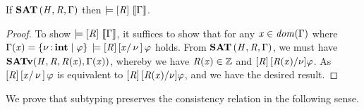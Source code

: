 \begin{lemma}
  \label{lem:sat-implies-gamma}
  If $\mathbf{SAT} \, (  \mathit{H}  ,  \mathit{R}  ,  \Gamma  )$ then $\models  [  \mathit{R}  ] \,  \left\llbracket{ \Gamma }\right\rrbracket $.
\end{lemma}
\begin{proof}
  To show $\models  [  \mathit{R}  ] \,  \left\llbracket{ \Gamma }\right\rrbracket $, it suffices to show that for any $ \mathit{x}  \in   \mathit{dom}( \Gamma )  $ where $\Gamma  (  \mathit{x}  )  =   \left\{{  \nu  \operatorname{:} \mathbf{int} \mid  \varphi }\right\} $
  $\models  [  \mathit{R}  ] \, [  \mathit{x}  / \, \nu \, ] \, \varphi$ holds. From $\mathbf{SAT} \, (  \mathit{H}  ,  \mathit{R}  ,  \Gamma  )$, we must have $ \mathbf{SATv} ( \mathit{H} , \mathit{R} , \mathit{R}  (  \mathit{x}  ) , \Gamma  (  \mathit{x}  ) ) $, whereby
  we have $ \mathit{R}  (  \mathit{x}  )  \in  \mathbb{Z} $ and $[  \mathit{R}  ] \, [  \mathit{R}  (  \mathit{x}  )  /  \nu  ]  \varphi$. As $[  \mathit{R}  ] \, [  \mathit{x}  / \, \nu \, ] \, \varphi$ is equivalent to $[  \mathit{R}  ] \, [  \mathit{R}  (  \mathit{x}  )  /  \nu  ]  \varphi$,
  and we have the desired result.
\end{proof}


We prove that subtyping preserves the consistency relation in the following sense.

